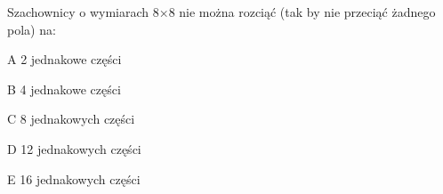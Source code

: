 \begin{tresc}
Szachownicy o wymiarach 8×8 nie można rozciąć (tak by nie przeciąć żadnego pola) na:
\end{tresc}
\begin{wariant}{A} 2 jednakowe części \end{wariant}
\begin{wariant}{B} 4 jednakowe części \end{wariant}
\begin{wariant}{C} 8 jednakowych części \end{wariant}
\begin{wariant}{D} 12 jednakowych części \end{wariant}
\begin{wariant}{E} 16 jednakowych części \end{wariant}
